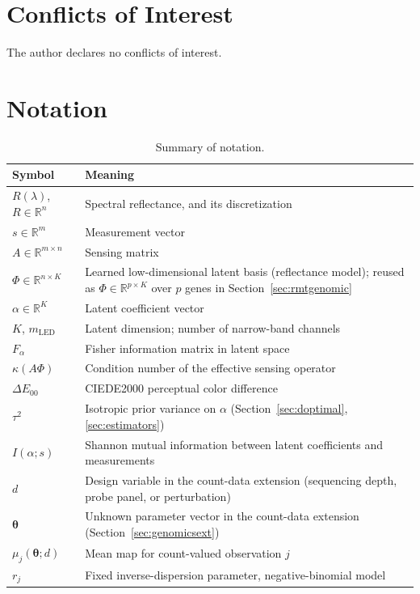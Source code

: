 \documentclass[11pt]{article}
\begin{document}
\section*{Conflicts of Interest}
The author declares no conflicts of interest.

\appendix
\section{Notation}

\begin{table}[H]
\centering
\caption{Summary of notation.\label{tabA1}}
\begin{tabularx}{\textwidth}{lX}
\toprule
\textbf{Symbol} & \textbf{Meaning}\\
\midrule
$R(\lambda)$, $R\in\mathbb{R}^n$ & Spectral reflectance, and its discretization\\
$s\in\mathbb{R}^m$ & Measurement vector\\
$A\in\mathbb{R}^{m\times n}$ & Sensing matrix\\
$\Phi\in\mathbb{R}^{n\times K}$ & Learned low-dimensional latent basis (reflectance model); reused as $\Phi\in\mathbb{R}^{p\times K}$ over $p$ genes in Section~\ref{sec:rmtgenomic}\\
$\alpha\in\mathbb{R}^K$ & Latent coefficient vector\\
$K$, $m_{\mathrm{LED}}$ & Latent dimension; number of narrow-band channels\\
$F_\alpha$ & Fisher information matrix in latent space\\
$\kappa(A\Phi)$ & Condition number of the effective sensing operator\\
$\Delta E_{00}$ & CIEDE2000 perceptual color difference~\citep{ref5,ref16}\\
$\tau^2$ & Isotropic prior variance on $\alpha$ (Section~\ref{sec:doptimal}, \ref{sec:estimators})\\
$I(\alpha;s)$ & Shannon mutual information between latent coefficients and measurements\\
$d$ & Design variable in the count-data extension (sequencing depth, probe panel, or perturbation)\\
$\boldsymbol\theta$ & Unknown parameter vector in the count-data extension (Section~\ref{sec:genomicsext})\\
$\mu_j(\boldsymbol\theta;d)$ & Mean map for count-valued observation $j$\\
$r_j$ & Fixed inverse-dispersion parameter, negative-binomial model\\

\end{tabularx}
\end{table}
\end{document}
